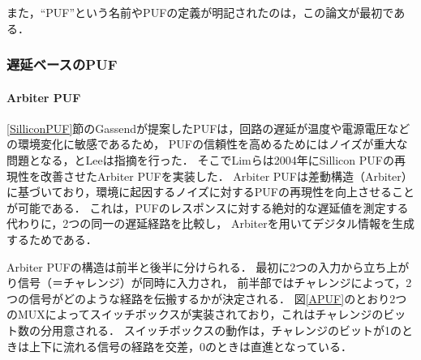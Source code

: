 \documentclass[technicalreport]{ieicej} %
\begin{document}
また，“PUF”という名前やPUFの定義が明記されたのは，この論文が最初である．

\subsubsection{遅延ベースのPUF}
\label{delaypuf}
\paragraph{Arbiter PUF}
\label{apuf}
\ref{SilliconPUF}節のGassendが提案したPUFは，回路の遅延が温度や電源電圧などの環境変化に敏感であるため，
PUFの信頼性を高めるためにはノイズが重大な問題となる，とLeeは指摘を行った\cite{lee}．
そこでLimらは2004年にSillicon PUFの再現性を改善させたArbiter PUF\cite{lim}を実装した．
Arbiter PUFは差動構造（Arbiter）に基づいており，環境に起因するノイズに対するPUFの再現性を向上させることが可能である．
これは，PUFのレスポンスに対する絶対的な遅延値を測定する代わりに，2つの同一の遅延経路を比較し，
Arbiterを用いてデジタル情報を生成するためである．

Arbiter PUFの構造は前半と後半に分けられる．
最初に2つの入力から立ち上がり信号（＝チャレンジ）が同時に入力され，
前半部ではチャレンジによって，2つの信号がどのような経路を伝搬するかが決定される．
図\ref{APUF}のとおり2つのMUXによってスイッチボックスが実装されており，これはチャレンジのビット数の分用意される．
スイッチボックスの動作は，チャレンジのビットが1のときは上下に流れる信号の経路を交差，0のときは直進となっている．
\end{document}
